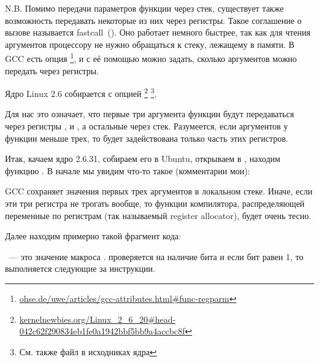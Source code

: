 \newcommand{\URLREGPARM}{\href{http://go.yurichev.com/17040}{ohse.de/uwe/articles/gcc-attributes.html\#func-regparm}}

\label{regparm}
N.B. Помимо передачи параметров функции через стек, существует также возможность передавать 
некоторые из них через регистры. Такое соглашение о вызове называется fastcall~().
Оно работает немного быстрее, так как для чтения аргументов процессору не нужно обращаться к стеку, лежащему в памяти. 
В GCC есть опция \footnote{\URLREGPARM}, 
и с её помощью можно задать, сколько аргументов можно передать через регистры.

\newcommand{\URLKERNELNEWB}{\href{http://go.yurichev.com/17066}{kernelnewbies.org/Linux\_2\_6\_20\#head-042c62f290834eb1fe0a1942bbf5bb9a4accbc8f}}
\newcommand{\CALLINGHFILE}{arch/x86/include/asm/calling.h}

Ядро Linux 2.6 собирается с опцией \footnote{\URLKERNELNEWB}
\footnote{См. также файл \TT{\CALLINGHFILE} в исходниках ядра}.

Для нас это означает, что первые три аргумента функции будут передаваться через регистры \EAX, \EDX и \ECX, 
а остальные через стек. Разумеется, если аргументов у функции меньше трех, то будет задействована 
только часть этих регистров.

Итак, качаем ядро 2.6.31, собираем его в Ubuntu, открываем в \IDA, 
находим функцию . В начале мы увидим что-то такое (комментарии мои):



GCC сохраняет значения первых трех аргументов в локальном стеке. Иначе, если эти три регистра 
не трогать вообще, то функции компилятора, распределяющей переменные по регистрам (так называемый 
\gls{register allocator}), будет очень тесно.

Далее находим примерно такой фрагмент кода:



~--- это значение макроса . 
 проверяется на наличие бита  и если бит равен 1, то выполняется следующие 
за \JNZ инструкции.
